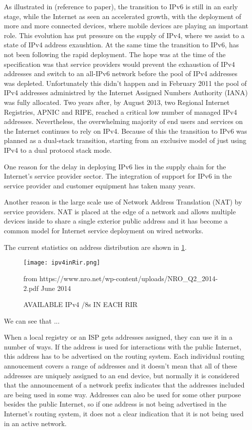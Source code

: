 \documentclass[11pt]{report}
\begin{document}
As illustrated in (reference to paper), the transition to IPv6 is still in an early stage, while the Internet as seen an accelerated growth, with the deployment of more and more connected devices, where mobile devices are playing an important role. This evolution has put pressure on the supply of IPv4, where we assist to a state of IPv4 address exaushtion. At the same time the transition to IPv6, has not been following the rapid deployment. The hope was at the time of the specification was that service providers would prevent the exhaustion of IPv4 addresses and switch to an all-IPv6 network before the pool of IPv4 addresses was depleted. Unfortunately this didn't happen and in February 2011 the pool of IPv4 addresses administred by the Internet Assigned Numbers Authority (IANA) was fully allocated. Two years after, by August 2013, two Regional Internet Registries, APNIC and RIPE, reached a critical low number of managed IPv4 addresses. Nevertheless, the overwhelming majority of end users and services on the Internet continues to rely on IPv4. Because of this the transition to IPv6 was planned as a dual-stack transition, starting from an exclusive model of just using IPv4 to a dual protocol stack mode.

One reason for the delay in deploying IPv6 lies in the supply chain for the Internet's service provider sector. The integration of support for IPv6 in the service provider and customer equipment has taken many years.  

Another reason is the large scale use of Network Address Translation (NAT) by service providers. NAT is placed at the edge of a network and allows multiple devices inside to share a single exterior public address and it has become a common model for Internet service deployment on wired networks. 

The current statistics on address distribution are shown in \ref{fig:rirs_available_ipv4}.

\begin{figure}[h!]
\centering
\texttt{[image: ipv4inRir.png]}
\caption{AVAILABLE IPv4 /8s IN EACH RIR}
from https://www.nro.net/wp-content/uploads/NRO\_Q2\_2014-2.pdf June 2014
\label{fig:rirs_available_ipv4}
\end{figure}

We can see that ...

When a local registry or an ISP gets addresses assigned, they can use it in a number of ways. If the address is used for interactions with the public Internet, this address has to be advertised on the routing system. Each individual routing annoucement covers a range of addresses and it doesn't mean that all of these addresses are uniquely assigned to an end device, but normally it is considered that the announcement of a network prefix indicates that the addresses included are being used in some way. Addresses can also be used for some other purpose besides the public Internet, so if one address is not being advertised in the Internet's routing system, it does not a clear indication that it is not being used in an active network.
\end{document}
